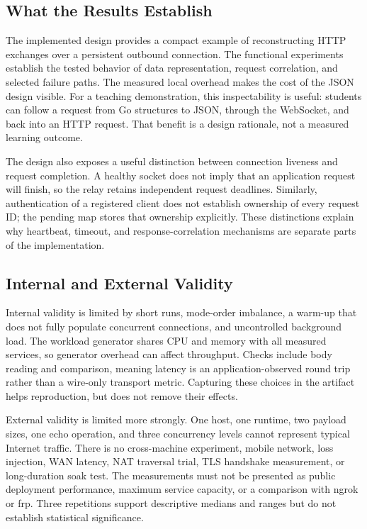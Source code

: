 \documentclass[conference]{IEEEtran}
\begin{document}
\subsection{What the Results Establish}

The implemented design provides a compact example of reconstructing HTTP exchanges over a persistent outbound connection. The functional experiments establish the tested behavior of data representation, request correlation, and selected failure paths. The measured local overhead makes the cost of the JSON design visible. For a teaching demonstration, this inspectability is useful: students can follow a request from Go structures to JSON, through the WebSocket, and back into an HTTP request. That benefit is a design rationale, not a measured learning outcome.

The design also exposes a useful distinction between connection liveness and request completion. A healthy socket does not imply that an application request will finish, so the relay retains independent request deadlines. Similarly, authentication of a registered client does not establish ownership of every request ID; the pending map stores that ownership explicitly. These distinctions explain why heartbeat, timeout, and response-correlation mechanisms are separate parts of the implementation.

\subsection{Internal and External Validity}

Internal validity is limited by short runs, mode-order imbalance, a warm-up that does not fully populate concurrent connections, and uncontrolled background load. The workload generator shares CPU and memory with all measured services, so generator overhead can affect throughput. Checks include body reading and comparison, meaning latency is an application-observed round trip rather than a wire-only transport metric. Capturing these choices in the artifact helps reproduction, but does not remove their effects.

External validity is limited more strongly. One host, one runtime, two payload sizes, one echo operation, and three concurrency levels cannot represent typical Internet traffic. There is no cross-machine experiment, mobile network, loss injection, WAN latency, NAT traversal trial, TLS handshake measurement, or long-duration soak test. The measurements must not be presented as public deployment performance, maximum service capacity, or a comparison with ngrok or frp. Three repetitions support descriptive medians and ranges but do not establish statistical significance.
\end{document}
